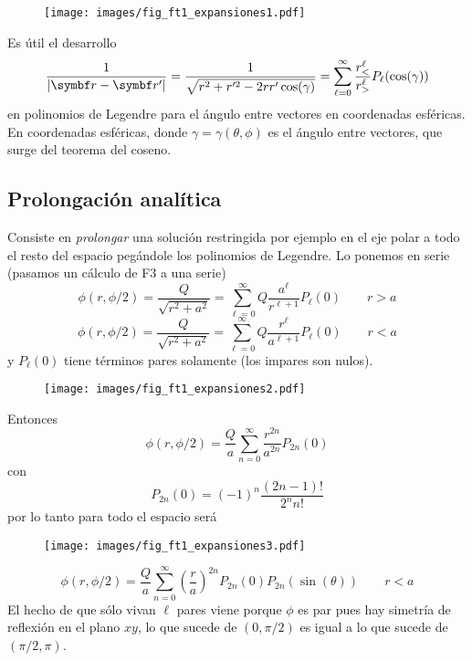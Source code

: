 \documentclass[10pt,oneside]{CBFT_book}
\begin{document}
\begin{figure}[thb]
	\begin{center}
	\texttt{[image: images/fig\_ft1\_expansiones1.pdf]}	 
	\end{center}
	\caption{}
\end{figure} 

Es útil el desarrollo
\[
	\frac{1}{|\vb{r} - \vb{r}'|} = \frac{1}{\sqrt{r^2 + r'^2 -2rr'\cos(\gamma)}}
	= \sum_{\ell=0}^\infty \frac{r^\ell_{<}}{r^\ell_{>}} P_\ell (\cos(\gamma))
\]
en polinomios de Legendre para el ángulo entre vectores en coordenadas esféricas.
En coordenadas esféricas, donde $\gamma=\gamma(\theta,\phi)$ es el ángulo entre vectores,
que surge del teorema del coseno.

\subsection{Prolongación analítica}

Consiste en {\it prolongar} una solución restringida por ejemplo en el eje polar a todo el
resto del espacio pegándole los polinomios de Legendre.
Lo ponemos en serie (pasamos un cálculo de F3 a una serie)
\[
	\phi(r,\phi/2) = \frac{Q}{\sqrt{r^2 + a^2}} = \sum_{\ell=0}^\infty Q \frac{a^\ell}{r^{\ell + 1}} 
	P_\ell (0) \qquad r > a
\]
\[
	\phi(r,\phi/2) = \frac{Q}{\sqrt{r^2 + a^2}} = \sum_{\ell=0}^\infty Q \frac{r^\ell}{a^{\ell + 1}} 
	P_\ell (0) \qquad r < a
\]
y $P_\ell(0)$ tiene términos pares solamente (los impares son nulos).

\begin{figure}[htb]
	\begin{center}
	\texttt{[image: images/fig\_ft1\_expansiones2.pdf]}	 
	\end{center}
	\caption{}
\end{figure} 

Entonces
\[
	\phi(r,\phi/2) = \frac{Q}{a} \sum_{n=0}^\infty \frac{r^{2n}}{a^{2n}} P_{2n} (0) 
\]
con 
\[
	P_{2n} (0) = (-1)^n \frac{(2n-1)!}{2^n n!}
\]
por lo tanto para todo el espacio será

\begin{figure}[htb]
	\begin{center}
	\texttt{[image: images/fig\_ft1\_expansiones3.pdf]}	 
	\end{center}
	\caption{}
\end{figure} 

\[
	\phi(r,\phi/2) = \frac{Q}{a} \sum_{n=0}^\infty \left( \frac{r}{a}\right)^{2n} P_{2n} (0) P_{2n} 
	(\sin(\theta)) \qquad r < a
\]
El hecho de que sólo vivan $\ell$ pares viene porque $\phi$ es par pues hay simetría de reflexión en el
plano $xy$, lo que sucede de $(0,\pi/2)$ es igual a lo que sucede de $(\pi/2, \pi)$.
\end{document}
